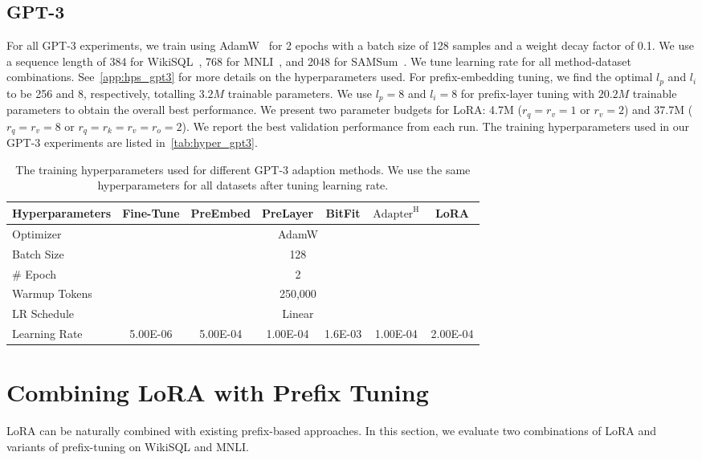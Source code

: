 \documentclass{article} %
\begin{document}
\subsection{GPT-3}
\label{app:hps_gpt3}
For all GPT-3 experiments, we train using AdamW~\citep{loshchilov2017decoupled} for 2 epochs with a batch size of 128 samples and a weight decay factor of 0.1.
We use a sequence length of 384 for WikiSQL~\citep{DBLP:journals/corr/abs-1709-00103}, 768 for MNLI~\citep{williams-etal-2018-broad}, and 2048 for SAMSum~\citep{DBLP:journals/corr/abs-1911-12237}.
We tune learning rate for all method-dataset combinations.
See~\autoref{app:hps_gpt3} for more details on the hyperparameters used.
For prefix-embedding tuning, we find the optimal $l_p$ and $l_i$ to be 256 and 8, respectively, totalling $3.2M$ trainable parameters.
We use $l_p=8$ and $l_i=8$ for prefix-layer tuning with $20.2M$ trainable parameters to obtain the overall best performance.
We present two parameter budgets for LoRA: 4.7M ($r_q=r_v=1$ or $r_{v}=2$) and 37.7M ($r_q=r_v=8$ or $r_q=r_k=r_v=r_o=2$).
We report the best validation performance from each run.
The training hyperparameters used in our GPT-3 experiments are listed in~\autoref{tab:hyper_gpt3}.
\begin{table}[h]
\centering
\begin{tabular}{l|cccccc}
\hline
\toprule
Hyperparameters & Fine-Tune & PreEmbed & PreLayer & BitFit & $\text{Adapter}^\text{H}$ & LoRA \\
\midrule
Optimizer & \multicolumn{6}{c}{AdamW} \\
Batch Size   & \multicolumn{6}{c}{128} \\
\# Epoch & \multicolumn{6}{c}{2} \\
Warmup Tokens & \multicolumn{6}{c}{250,000} \\
LR Schedule & \multicolumn{6}{c}{Linear} \\
\midrule
Learning Rate & 5.00E-06 & 5.00E-04 & 1.00E-04 & 1.6E-03 & 1.00E-04 & 2.00E-04 \\

\bottomrule
\end{tabular}
\caption{The training hyperparameters used for different GPT-3 adaption methods. We use the same hyperparameters for all datasets after tuning learning rate.}
\label{tab:hyper_gpt3}
\end{table}


\section{Combining LoRA with Prefix Tuning}
\label{app:lora_plus}
LoRA can be naturally combined with existing prefix-based approaches.
In this section, we evaluate two combinations of LoRA and variants of prefix-tuning on WikiSQL and MNLI.
\end{document}
